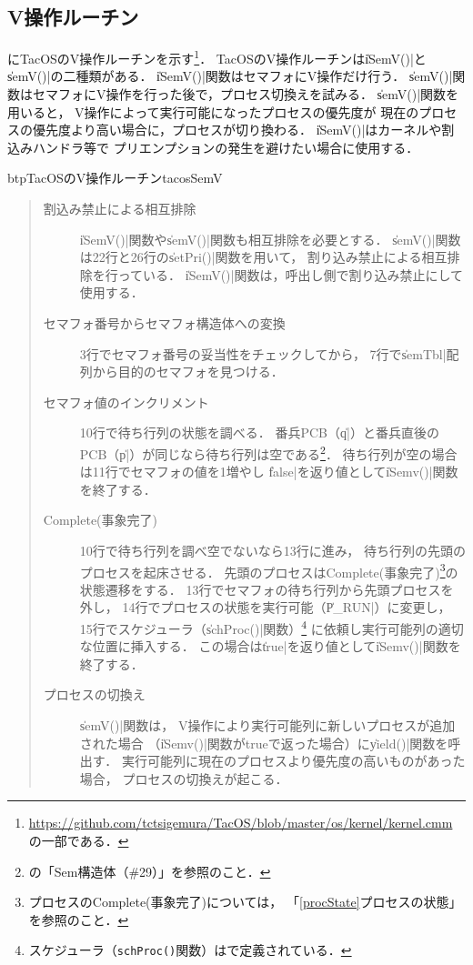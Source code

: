 \subsection{V操作ルーチン}
にTacOSのV操作ルーチンを示す\footnote{
\url{https://github.com/tctsigemura/TacOS/blob/master/os/kernel/kernel.cmm}
の一部である．}．
TacOSのV操作ルーチンは\|iSemV()|と\|semV()|の二種類がある．
\|iSemV()|関数はセマフォにV操作だけ行う．
\|semV()|関数はセマフォにV操作を行った後で，プロセス切換えを試みる．
\|semV()|関数を用いると，
V操作によって実行可能になったプロセスの優先度が
現在のプロセスの優先度より高い場合に，プロセスが切り換わる．
\|iSemV()|はカーネルや割込みハンドラ等で
プリエンプションの発生を避けたい場合に使用する．

\begin{myfig}{btp}{TacOSのV操作ルーチン}{tacosSemV}

\end{myfig}

\begin{quote}
\begin{description}
\item [割込み禁止による相互排除]
\|iSemV()|関数や\|semV()|関数も相互排除を必要とする．
\|semV()|関数は22行と26行の\|setPri()|関数を用いて，
割り込み禁止による相互排除を行っている．
\|iSemV()|関数は，呼出し側で割り込み禁止にして使用する．

\item [セマフォ番号からセマフォ構造体への変換]
3行でセマフォ番号の妥当性をチェックしてから，
7行で\|semTbl|配列から目的のセマフォを見つける．

\item [セマフォ値のインクリメント]
10行で待ち行列の状態を調べる．
番兵PCB（\|q|）と番兵直後のPCB（\|p|）が同じなら待ち行列は空である\footnote{
の「Sem構造体（\#29）」を参照のこと．}．
待ち行列が空の場合は11行でセマフォの値を1増やし
\|false|を返り値として\|iSemv()|関数を終了する．

\item [Complete(事象完了)]
10行で待ち行列を調べ空でないなら13行に進み，
待ち行列の先頭のプロセスを起床させる．
先頭のプロセスはComplete(事象完了)\footnote{
プロセスのComplete(事象完了)については，
「\ref{procState}プロセスの状態」を参照のこと．}の状態遷移をする．
13行でセマフォの待ち行列から先頭プロセスを外し，
14行でプロセスの状態を実行可能（\|P_RUN|）に変更し，
15行でスケジューラ（\|schProc()|関数）\footnote{
スケジューラ（{\tt schProc()}関数）はで定義されている．}
に依頼し実行可能列の適切な位置に挿入する．
この場合は\|true|を返り値として\|iSemv()|関数を終了する．

\item [プロセスの切換え]
\|semV()|関数は，
V操作により実行可能列に新しいプロセスが追加された場合
（\|iSemv()|関数がtrueで返った場合）に\|yield()|関数を呼出す．
実行可能列に現在のプロセスより優先度の高いものがあった場合，
プロセスの切換えが起こる．
\end{description}
\end{quote}

